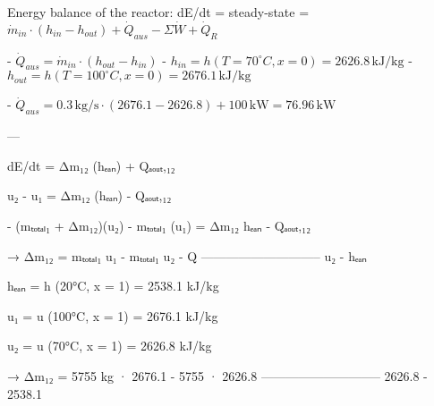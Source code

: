 Energy balance of the reactor:  
dE/dt = steady-state = \( \dot{m}_{in} \cdot (h_{in} - h_{out}) + \dot{Q}_{aus} - \Sigma \dot{W} + \dot{Q}_R \)  

- \( \dot{Q}_{aus} = \dot{m}_{in} \cdot (h_{out} - h_{in}) \)  
- \( h_{in} = h(T = 70^\circ C, x = 0) = 2626.8 \, \text{kJ/kg} \)  
- \( h_{out} = h(T = 100^\circ C, x = 0) = 2676.1 \, \text{kJ/kg} \)  

- \( \dot{Q}_{aus} = 0.3 \, \text{kg/s} \cdot (2676.1 - 2626.8) + 100 \, \text{kW} = 76.96 \, \text{kW} \)  

---

dE/dt = Δm₁₂ (hₑₐₙ) + Qₐₒᵤₜ,₁₂  

u₂ - u₁ = Δm₁₂ (hₑₐₙ) - Qₐₒᵤₜ,₁₂  

- (mₜₒₜₐₗ₁ + Δm₁₂)(u₂) - mₜₒₜₐₗ₁ (u₁) = Δm₁₂ hₑₐₙ - Qₐₒᵤₜ,₁₂  

→ Δm₁₂ = mₜₒₜₐₗ₁ u₁ - mₜₒₜₐₗ₁ u₂ - Q  
-----------------------------  
u₂ - hₑₐₙ  

hₑₐₙ = h (20°C, x = 1) = 2538.1 kJ/kg  

u₁ = u (100°C, x = 1) = 2676.1 kJ/kg  

u₂ = u (70°C, x = 1) = 2626.8 kJ/kg  

→ Δm₁₂ = 5755 kg · 2676.1 - 5755 · 2626.8  
-----------------------------  
2626.8 - 2538.1